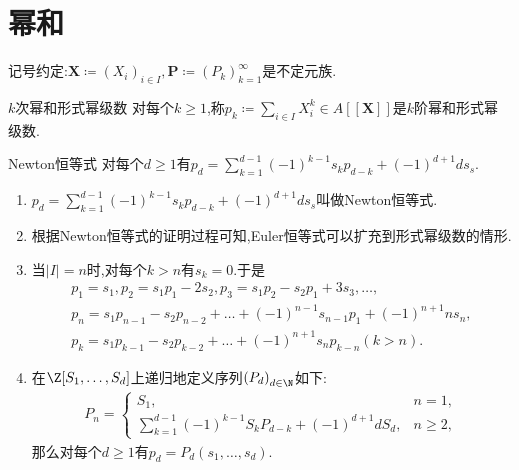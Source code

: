 \section{幂和}

记号约定:$\mathbf{X}\coloneq\left(X_{i}\right)_{i\in I},\mathbf{P}\coloneq\left(P_{k}\right)_{k=1}^{\infty}$是不定元族.

\begin{definition}{$k$次幂和形式幂级数}{}
	对每个$k\geq 1$,称$p_{k}\coloneq\sum\limits_{i\in I}X_{i}^{k}\in A[[\mathbf{X}]]$是$k$阶幂和形式幂级数.
\end{definition}

\begin{lemma}{Newton恒等式}{}
	对每个$d\geq 1$有$p_{d}=\sum\limits_{k=1}^{d-1}\left(-1\right)^{k-1}s_{k}p_{d-k}+\left(-1\right)^{d+1}ds_{s}$.
\end{lemma}

\begin{remark}{}{}
	\begin{enumerate}
		\item $p_{d}=\sum\limits_{k=1}^{d-1}\left(-1\right)^{k-1}s_{k}p_{d-k}+\left(-1\right)^{d+1}ds_{s}$叫做Newton恒等式.
		\item 根据Newton恒等式的证明过程可知,Euler恒等式可以扩充到形式幂级数的情形.
		\item 当$\left|I\right|=n$时,对每个$k>n$有$s_{k}=0$.于是
		\begin{gather*}
			p_{1}=s_{1},p_{2}=s_{1}p_{1}-2s_{2},p_{3}=s_{1}p_{2}-s_{2}p_{1}+3s_{3},\ldots,\\
			p_{n}=s_{1}p_{n-1}-s_{2}p_{n-2}+\ldots+\left(-1\right)^{n-1}s_{n-1}p_{1}+\left(-1\right)^{n+1}ns_{n},\\
			p_{k}=s_{1}p_{k-1}-s_{2}p_{k-2}+\ldots+\left(-1\right)^{n+1}s_{n}p_{k-n}(k>n).
		\end{gather*}
		\item 在$\Z[S_{1},\ldots,S_{d}]$上递归地定义序列$\left(P_{d}\right)_{d\in\N}$如下:
		\begin{align*}
			P_{n}=
			\begin{cases}
				S_{1},&n=1,\\
				\sum\limits_{k=1}^{d-1}\left(-1\right)^{k-1}S_{k}P_{d-k}+\left(-1\right)^{d+1}dS_{d},&n\geq 2,
			\end{cases}
		\end{align*}
		那么对每个$d\geq 1$有$p_{d}=P_{d}\left(s_{1},\ldots,s_{d}\right)$.
	\end{enumerate}
\end{remark}


